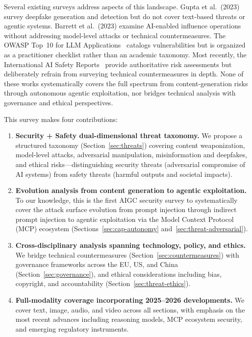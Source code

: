 Several existing surveys address aspects of this landscape. Gupta et al.~(2023) survey deepfake generation and detection but do not cover text-based threats or agentic systems. Barrett et al.~(2023) examine AI-enabled influence operations without addressing model-level attacks or technical countermeasures. The OWASP Top~10 for LLM Applications~\cite{owasp2025} catalogs vulnerabilities but is organized as a practitioner checklist rather than an academic taxonomy. Most recently, the International AI Safety Reports~\cite{aisafetyreport2025,aisafetyreport2026} provide authoritative risk assessments but deliberately refrain from surveying technical countermeasures in depth. None of these works systematically covers the full spectrum from content-generation risks through autonomous agentic exploitation, nor bridges technical analysis with governance and ethical perspectives.

This survey makes four contributions:
\begin{enumerate}[nosep,leftmargin=1.5em]
    \item \textbf{Security + Safety dual-dimensional threat taxonomy.} We propose a structured taxonomy (Section~\ref{sec:threats}) covering content weaponization, model-level attacks, adversarial manipulation, misinformation and deepfakes, and ethical risks---distinguishing security threats (adversarial compromise of AI systems) from safety threats (harmful outputs and societal impacts).
    \item \textbf{Evolution analysis from content generation to agentic exploitation.} To our knowledge, this is the first AIGC security survey to systematically cover the attack surface evolution from prompt injection through indirect prompt injection to agentic exploitation via the Model Context Protocol (MCP) ecosystem (Sections~\ref{sec:cap-autonomy} and~\ref{sec:threat-adversarial}).
    \item \textbf{Cross-disciplinary analysis spanning technology, policy, and ethics.} We bridge technical countermeasures (Section~\ref{sec:countermeasures}) with governance frameworks across the EU, US, and China (Section~\ref{sec:governance}), and ethical considerations including bias, copyright, and accountability (Section~\ref{sec:threat-ethics}).
    \item \textbf{Full-modality coverage incorporating 2025--2026 developments.} We cover text, image, audio, and video across all sections, with emphasis on the most recent advances including reasoning models, MCP ecosystem security, and emerging regulatory instruments.
\end{enumerate}

